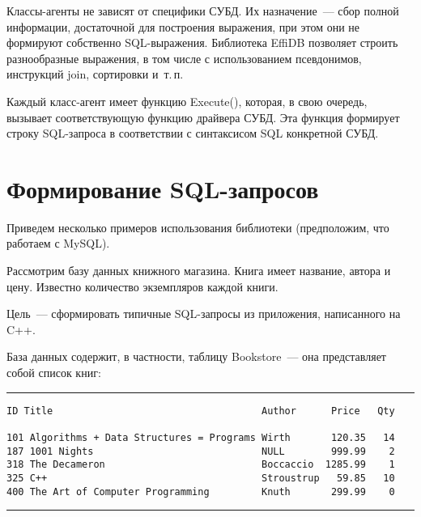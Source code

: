 \begin{multicols}{2}
Классы-агенты не зависят от специфики СУБД. Их назначение~--- сбор полной 
информации, достаточной для построения выражения, при этом они не формируют 
собственно SQL-вы\-ра\-же\-ния. Биб\-лиотека \mbox{EffiDB} 
позволяет строить разнообразные выражения, в 
том числе с использованием псевдонимов, инструкций join, сортировки и~т.\,п.

Каждый класс-агент имеет функцию {\sf Execute()}, которая, в свою очередь, вызывает 
соот\-вет\-ст\-ву\-ющую функцию драйвера СУБД. Эта функция формирует строку 
SQL-за\-про\-са в соответствии с синтаксисом SQL конкретной СУБД.

\section{Формирование SQL-запросов}

Приведем несколько примеров использования библиотеки (предположим, что работаем с 
MySQL).

Рассмотрим базу данных книжного магазина. Книга имеет название, автора и цену. 
Известно количество экземпляров каждой книги.

Цель~--- сформировать типичные SQL-запросы из приложения, написанного на C++.

База данных содержит, в частности, таблицу Bookstore~--- она представляет собой список 
книг: 

\end{multicols}

\hrule

\begin{verbatim}
ID Title                                    Author      Price   Qty

101 Algorithms + Data Structures = Programs Wirth       120.35   14
187 1001 Nights                             NULL        999.99    2
318 The Decameron                           Boccaccio  1285.99    1
325 C++                                     Stroustrup   59.85   10
400 The Art of Computer Programming         Knuth       299.99    0
\end{verbatim}

\vspace*{3pt}

\hrule

